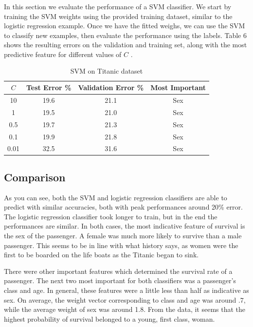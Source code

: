 \documentclass[12pt, twocolumn]{article}
\begin{document}
In this section we evaluate the performance of a SVM classifier. We start by training the SVM weights using the provided training dataset, similar to the logistic regression example. Once we have the fitted weighs, we can use the SVM to classify new examples, then evaluate the performance using the labels. Table 6 shows the resulting errors on the validation and training set, along with the most predictive feature for different values of $C$ .

\begin{table}
\tiny
 \caption{SVM on Titanic dataset}
  \begin{tabular}{ | c | c | c | c |}
 \hline
 $C$ & Test Error \% & Validation Error \% & Most Important  \\ \hline 
 10 &  19.6 & 21.1 &  Sex \\ \hline
 1 & 19.5 & 21.0 & Sex  \\ \hline
 0.5 & 19.7 & 21.3 & Sex \\ \hline
 0.1 & 19.9 & 21.8 & Sex  \\ \hline 
 0.01 & 32.5 & 31.6 & Sex \\ \hline
 \end{tabular}
 \label{SVM C1 T}
\end{table}

\subsection*{Comparison}

As you can see, both the SVM and logistic regression classifiers are able to predict with similar accuracies, both with peak performances around 20\% error. The logistic regression classifier took longer to train, but in the end the performances are similar. In both cases, the most indicative feature of survival is the sex of the passenger. A female was much more likely to survive than a male passenger. This seems to be in line with what history says, as women were the first to be boarded on the life boats as the Titanic began to sink.

There were other important features which determined the survival rate of a passenger. The next two most important for both classifiers was a passenger's class and age. In general, these features were a little less than half as indicative as sex. On average, the weight vector corresponding to class and age was around .7, while the average weight of sex was around 1.8. From the data, it seems that the highest probability of survival belonged to a young, first class, woman. 
\end{document}
